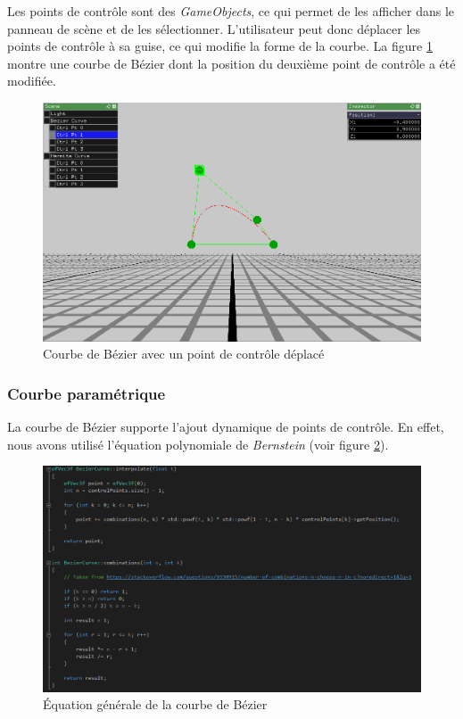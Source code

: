 Les points de contrôle sont des \emph{GameObjects}, ce qui permet de les afficher dans le panneau de scène et de les sélectionner.
L'utilisateur peut donc déplacer les points de contrôle à sa guise, ce qui modifie la forme de la courbe.
La figure \ref{fig:courbe_bezier2} montre une courbe de Bézier dont la position du deuxième point de contrôle a été modifiée.

\begin{figure}[H]
    \centering
	\includegraphics[scale=0.4]{fig/bezier2.png}
	\caption{Courbe de Bézier avec un point de contrôle déplacé}
	\label{fig:courbe_bezier2}
\end{figure}

\subsubsection{Courbe paramétrique}
\label{s:courbe_parametrique}
La courbe de Bézier supporte l'ajout dynamique de points de contrôle.
En effet, nous avons utilisé l'équation polynomiale de \emph{Bernstein} (voir figure \ref{fig:code_bezier}).

\begin{figure}[H]
    \centering
	\includegraphics[scale=0.5]{fig/code_bezier.png}
	\caption{Équation générale de la courbe de Bézier}
	\label{fig:code_bezier}
\end{figure}

